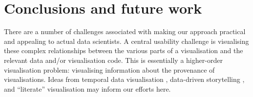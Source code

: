 \section{Conclusions and future work}

There are a number of challenges associated with making our approach practical
and appealing to actual data scientists. A central usability challenge is
visualising these complex relationships between the various parts of a
visualisation and the relevant data and/or visualisation code. This is
essentially a higher-order visualisation problem: visualising information about
the provenance of visualisations. Ideas from temporal data visualisation
\cite{bach16}, data-driven storytelling \cite{bach18}, and ``literate''
visualisation \cite{wood19} may inform our efforts here.
